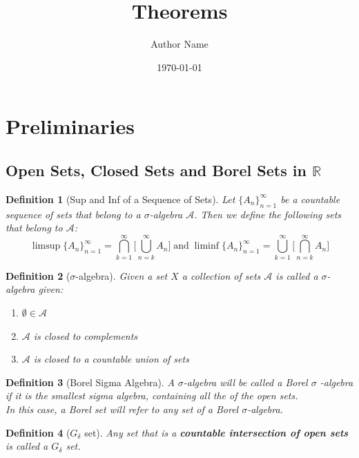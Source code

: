 \documentclass[11pt]{article}
\title{Theorems}
\author{Author Name}
\date{\today}
\newtheorem*{definition*}{Definition}
\begin{document}
\maketitle

\section[1]{Preliminaries}
\setcounter{subsection}{3}
\subsection{Open Sets, Closed Sets and Borel Sets in $\mathbb{R}$}
\begin{definition*}[Sup and Inf of a Sequence of Sets]
    Let ${\{ A_n \}}_{n=1}^{\infty}$ be a countable sequence of sets that belong to a $\sigma$-algebra $\mathcal{A}$.
    Then we define the following sets that belong to $\mathcal{A}$:
    \[
        \limsup{\{ A_n \}}_{n=1}^{\infty} = \bigcap_{k=1}^\infty \bigg[\bigcup_{n=k}^\infty A_n \bigg] \; \text{and} \;
        \liminf{\{ A_n \}}_{n=1}^{\infty} = \bigcup_{k=1}^\infty \bigg[\bigcap_{n=k}^\infty A_n \bigg]
    \]
\end{definition*}

\begin{definition*}[$\sigma$-algebra]
    Given a set $X$ a collection of sets $\mathcal{A}$ is called a $\sigma$-algebra given:
    \begin{enumerate}[label=(\roman*), leftmargin=*]
        \item $\emptyset \in \mathcal{A}$
        \item $\mathcal{A}$ is closed to complements
        \item $\mathcal{A}$ is closed to a countable union of sets
    \end{enumerate}
\end{definition*}

\begin{definition*}[Borel Sigma Algebra]
    A $\sigma$-algebra will be called a Borel $\sigma$ -algebra if it is the smallest sigma algebra, containing all the of the open sets. \\
    In this case, a Borel set will refer to any set of a Borel $\sigma$-algebra.
\end{definition*}

\begin{definition*}[$G_\delta$ set]
    Any set that is a \textbf{countable intersection of open sets} is called a $G_\delta$ set.
\end{definition*}
\end{document}
